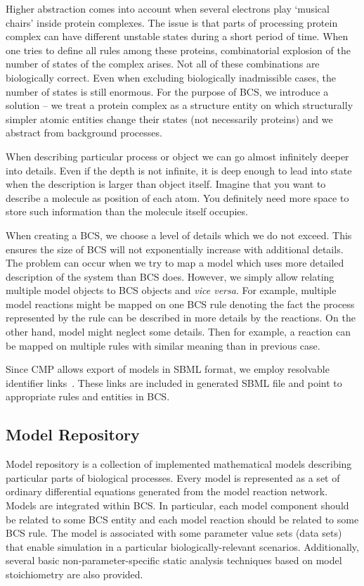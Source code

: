 \documentclass[12pt]{fithesis2}
\begin{document}
Higher abstraction comes into account when several electrons play `musical chairs' inside protein complexes. The issue is that parts of processing protein complex can have different unstable states during a short period of time. When one tries to define all rules among these proteins, combinatorial explosion of the number of states of the complex arises. Not all of these combinations are biologically correct. Even when excluding biologically inadmissible cases, the number of states is still enormous. For the purpose of BCS, we introduce a solution -- we treat a protein complex as a structure entity on which structurally simpler atomic entities change their states (not necessarily proteins) and we abstract from background processes.

When describing particular process or object we can go almost infinitely deeper into details. Even if the depth is not infinite, it is deep enough to lead into state when the description is larger than object itself. Imagine that you want to describe a molecule as position of each atom. You definitely need more space to store such information than the molecule itself occupies.

When creating a BCS, we choose a level of details which we do not exceed. This ensures the size of BCS will not exponentially increase with additional details. The problem can occur when we try to map a model which uses more detailed description of the system than BCS does. However, we simply allow relating multiple model objects to BCS objects and \emph{vice versa}. For example, multiple model reactions might be mapped on one BCS rule denoting the fact the process represented by the rule can be described in more details by the reactions. On the other hand, model might neglect some details. Then for example, a reaction can be mapped on multiple rules with similar meaning than in previous case.

Since CMP allows export of models in SBML format, we employ resolvable identifier links~\cite{juty2011identifiers}. These links are included in generated SBML file and point to appropriate rules and entities in BCS.

\subsection{Model Repository}
\label{model}

Model repository is a collection of implemented mathematical models describing particular parts of biological processes. Every model is represented as a set of ordinary differential equations generated from the model reaction network. Models are integrated within BCS. In particular, each model component should be related to some BCS entity and each model reaction should be related to some BCS rule. The model is associated with some parameter value sets (data sets) that enable simulation in a particular biologically-relevant scenarios. Additionally, several basic non-parameter-specific static analysis techniques based on model stoichiometry are also provided.
\end{document}
